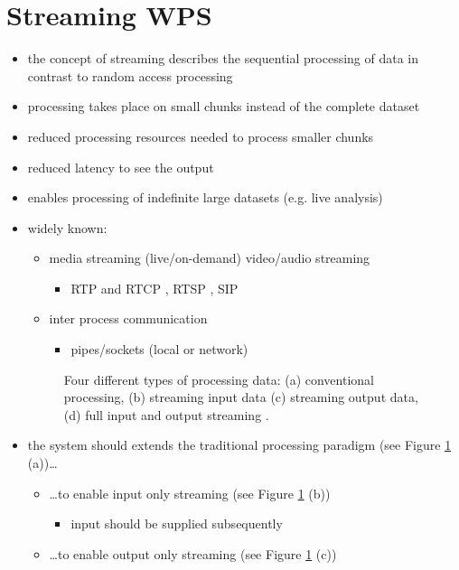 \section{Streaming WPS}
	\begin{itemize}
		\item the concept of streaming describes the sequential processing of data in contrast to random access processing
		\item processing takes place on small chunks instead of the complete dataset
		\item reduced processing resources needed to process smaller chunks
		\item reduced latency to see the output
		\item enables processing of indefinite large datasets (e.g. live analysis)
		\item widely known:
		\begin{itemize}
			\item media streaming (live/on-demand) video/audio streaming
			\begin{itemize}
				\item RTP and RTCP \citep{ietf:rfc3550}, RTSP \citep{ietf:rfc2326}, SIP \citep{ietf:rfc3261}
			\end{itemize}
			\item inter process communication
			\begin{itemize}
				\item pipes/sockets (local or network) \citep{buschmann1996pattern}
			\end{itemize}
		\end{itemize}
		\begin{figure}[!htb]
			\centering
			
			\caption{\label{fig:streaming}Four different types of processing data: (a) conventional processing, (b) streaming input data (c) streaming output data, (d) full input and output streaming \citep[based on][]{foerster2012live}.}
		\end{figure}
		\item the system should extends the traditional processing paradigm  (see Figure \ref{fig:streaming} (a))\dots
		\begin{itemize}
			\item \dots to enable input only streaming (see Figure \ref{fig:streaming} (b))
			\begin{itemize}
				\item input should be supplied subsequently
			\end{itemize}
			\item \dots to enable output only streaming  (see Figure \ref{fig:streaming} (c))

\end{itemize}
\end{itemize}
